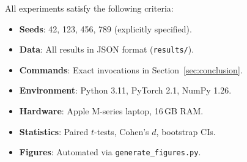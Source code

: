 \documentclass[conference]{IEEEtran}
\begin{document}
\vspace{0.3em}
\noindent All experiments satisfy the following criteria:
\begin{itemize}[leftmargin=*, nosep]
  \item \textbf{Seeds}: 42, 123, 456, 789 (explicitly specified).
  \item \textbf{Data}: All results in JSON format (\texttt{results/}).
  \item \textbf{Commands}: Exact invocations in Section~\ref{sec:conclusion}.
  \item \textbf{Environment}: Python 3.11, PyTorch 2.1, NumPy 1.26.
  \item \textbf{Hardware}: Apple M-series laptop, 16\,GB RAM.
  \item \textbf{Statistics}: Paired $t$-tests, Cohen's $d$, bootstrap CIs.
  \item \textbf{Figures}: Automated via \texttt{generate\_figures.py}.
\end{itemize}
\end{document}

